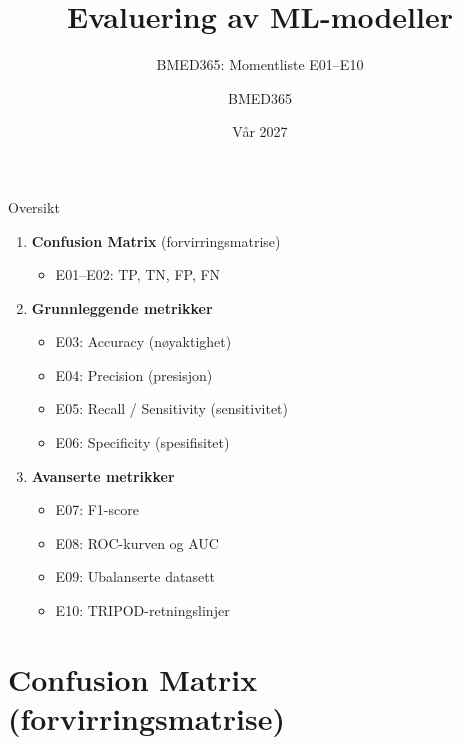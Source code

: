\documentclass[aspectratio=169, 10pt]{beamer}
\title{Evaluering av ML-modeller}
\subtitle{BMED365: Momentliste E01--E10}
\author{BMED365}
\date{Vår 2027}
\begin{document}
\begin{frame}
    \titlepage
\end{frame}

\begin{frame}{Oversikt}
    \begin{enumerate}
        \item \textbf{Confusion Matrix} (forvirringsmatrise)
        \begin{itemize}
            \item E01--E02: TP, TN, FP, FN
        \end{itemize}
        \item \textbf{Grunnleggende metrikker}
        \begin{itemize}
            \item E03: Accuracy (nøyaktighet)
            \item E04: Precision (presisjon)
            \item E05: Recall / Sensitivity (sensitivitet)
            \item E06: Specificity (spesifisitet)
        \end{itemize}
        \item \textbf{Avanserte metrikker}
        \begin{itemize}
            \item E07: F1-score
            \item E08: ROC-kurven og AUC
            \item E09: Ubalanserte datasett
            \item E10: TRIPOD-retningslinjer
        \end{itemize}
    \end{enumerate}
\end{frame}

\section{Confusion Matrix (forvirringsmatrise)}
\end{document}
